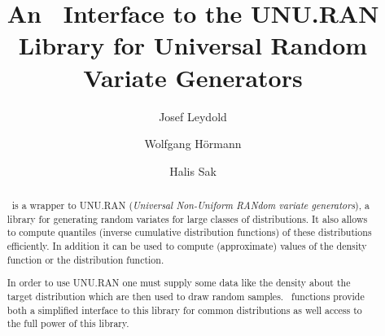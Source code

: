 
\subject{{\Huge\Runuran}}

\title{%
  An \R\ Interface to the UNU.RAN Library
  for Universal Random Variate Generators}

\author{Josef Leydold \and Wolfgang H\"ormann \and Halis Sak}

\publishers{%
  Department of Statistics and Mathematics, WU Wien, Austria\\
  Department for Industrial Engineering,
  Bo\u{g}azi\c{c}i University, Istanbul, Turkey
}


\maketitle


\begin{abstract}
  \noindent
  \Runuran\ is a wrapper to UNU.RAN (\emph{Universal
    Non-Uniform RANdom variate generators}), a library for generating
  random variates for large classes of distributions. It also allows
  to compute quantiles (inverse cumulative distribution 
  functions) of these distributions efficiently. 
  In addition it can be used to compute (approximate) values of the
  density function or the distribution function.

  In order to use UNU.RAN one must supply some data like the density 
  about the target distribution which are then used to draw random samples.
  \Runuran\ functions provide both a simplified interface to this
  library for common distributions as well access to the full power of
  this library.
\end{abstract}

